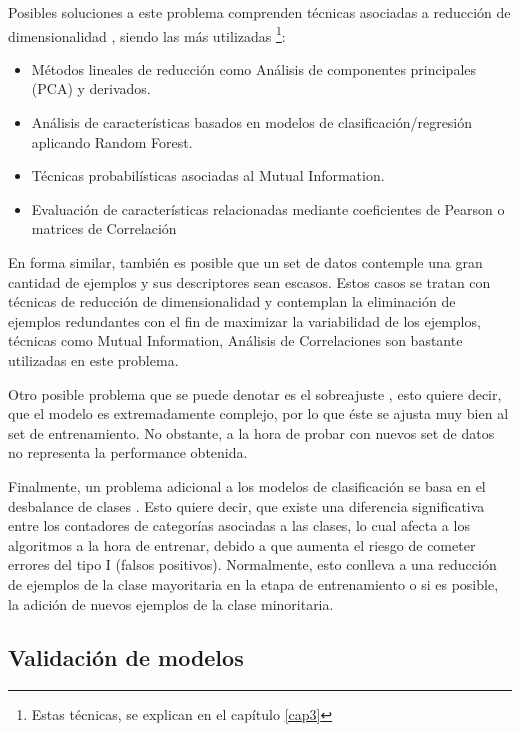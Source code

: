 Posibles soluciones a este problema comprenden técnicas asociadas a reducción de dimensionalidad \cite{sarwar2000application, van2009dimensionality}, siendo las más utilizadas \footnote{Estas técnicas, se explican en el capítulo \ref{cap3}}:

\begin{itemize}
	
	\item Métodos lineales de reducción como Análisis de componentes principales (PCA) y derivados.
	\item Análisis de características basados en modelos de clasificación/regresión aplicando Random Forest.
	\item Técnicas probabilísticas asociadas al Mutual Information.
	\item Evaluación de características relacionadas mediante coeficientes de Pearson o matrices de Correlación
\end{itemize}
 
En forma similar, también es posible que un set de datos contemple una gran cantidad de ejemplos y sus descriptores sean escasos. Estos casos se tratan con técnicas de reducción de dimensionalidad y contemplan la eliminación de ejemplos redundantes con el fin de maximizar la variabilidad de los ejemplos, técnicas como Mutual Information, Análisis de Correlaciones son bastante utilizadas en este problema.

Otro posible problema que se puede denotar es el sobreajuste \cite{hawkins2004problem}, esto quiere decir, que el modelo es extremadamente complejo, por lo que éste se ajusta muy bien al set de entrenamiento. No obstante, a la hora de probar con nuevos set de datos no representa la performance obtenida. 

Finalmente, un problema adicional a los modelos de clasificación se basa en el desbalance de clases \cite{japkowicz2002class}. Esto quiere decir, que existe una diferencia significativa entre los contadores de categorías asociadas a las clases, lo cual afecta a los algoritmos a la hora de entrenar, debido a que aumenta el riesgo de cometer errores del tipo I (falsos positivos). Normalmente, esto conlleva a una reducción de ejemplos de la clase mayoritaria en la etapa de entrenamiento o si es posible, la adición de nuevos ejemplos de la clase minoritaria. 

\subsection{Validación de modelos}


